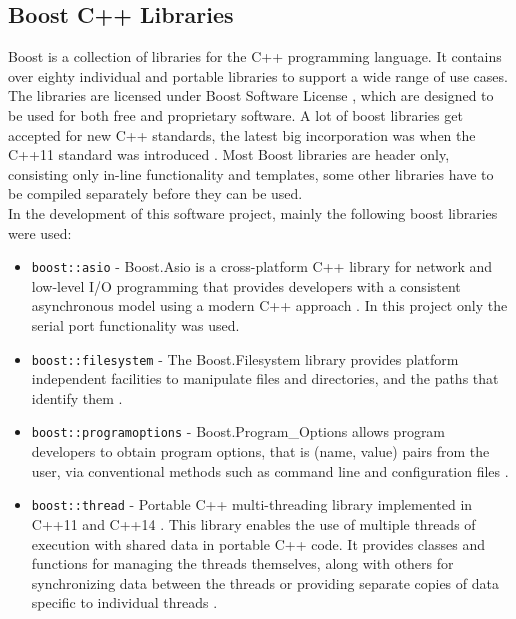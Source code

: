 \subsection{Boost C++ Libraries}
Boost \cite{boost} is a collection of libraries for the C++ programming language. It contains over eighty individual and portable libraries to support a wide range of use cases. %
The libraries are licensed under Boost Software License \cite{boostliz}, which are designed to be used for both free and proprietary software. A lot of boost libraries get accepted for new C++ standards, the latest big incorporation was when the C++11 standard was introduced \cite{booststd}. Most Boost libraries are header only, consisting only in-line functionality and templates, some other libraries have to be compiled separately before they can be used.\\
In the development of this software project, mainly the following boost libraries were used:
\begin{itemize}
\item \texttt{boost::asio} - Boost.Asio is a cross-platform C++ library for network and low-level I/O programming that provides developers with a consistent asynchronous model using a modern C++ approach \cite{boost_asio}. In this project only the serial port functionality was used.
\item \texttt{boost::filesystem} - The Boost.Filesystem library provides platform independent facilities to manipulate files and directories, and the paths that identify them \cite{boost_files}.
\item \texttt{boost::programoptions} - Boost.Program\_Options allows program developers to obtain program options, that is (name, value) pairs from the user, via conventional methods such as command line and configuration files \cite{boost_po}. 
\item \texttt{boost::thread} - Portable C++ multi-threading library implemented in C++11 \cite{cpp_11} and C++14 \cite{cpp_14}. This library enables the use of multiple threads of execution with shared data in portable C++ code. It provides classes and functions for managing the threads themselves, along with others for synchronizing data between the threads or providing separate copies of data specific to individual threads \cite{boost_thread}. 
\end{itemize}
